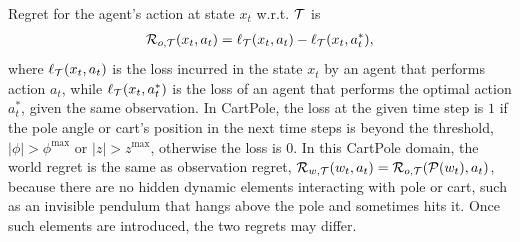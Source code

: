 
Regret for the agent's action at state $x_t$ w.r.t. $\cal T$ is
\begin{align}
    {\cal R}_{o,{\cal T}} ( x_t, a_t) = 
    \ell_{\cal T} (x_t, a_t) - \ell_{\cal T} (x_t, a^*_t),
     \nonumber
    \label{eq:Rx}
\end{align}
where $\ell_{\cal T} (x_t, a_t)$ is the loss incurred in the state $x_t$ by an agent that performs action $a_t$, while $\ell_{\cal T} (x_t, a^*_t)$ is the loss of an agent that performs the optimal action $a^*_t$, given the same observation.
In CartPole, the loss at the given time step is $1$ if the pole angle or cart's position in the next time steps is beyond the threshold, $|\phi|>\phi^{\text{max}}$ or $|z|>z^\text{max}$, otherwise the loss is $0$.
In this CartPole domain, the world regret is the same as observation regret, ${\cal R}_{w,{\cal T}} ( w_t, a_t) = {\cal R}_{o,{\cal T}} ( {\cal P}(w_t), a_t)$, because there are no hidden dynamic elements interacting with pole or cart, such as an invisible pendulum that hangs above the pole and sometimes hits it. Once such elements are introduced, the two regrets may differ.



